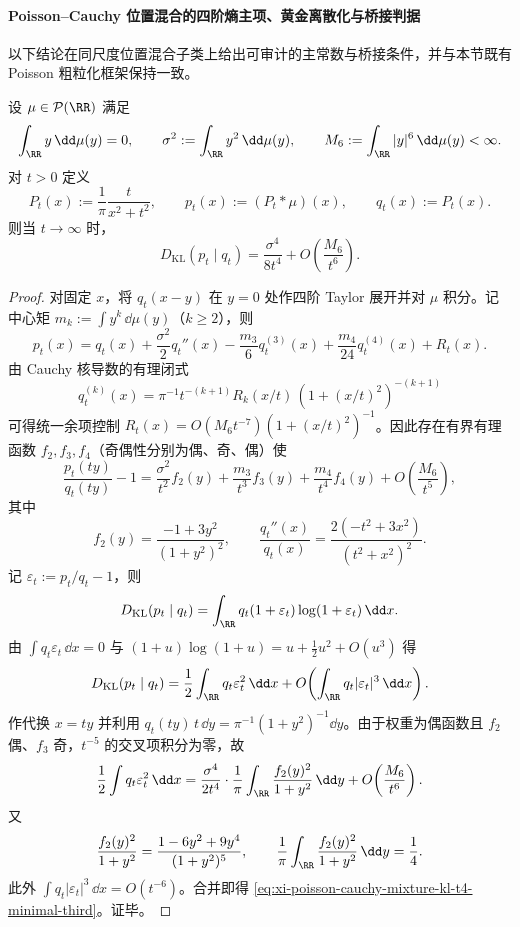 \paragraph{Poisson--Cauchy 位置混合的四阶熵主项、黄金离散化与桥接判据}
以下结论在同尺度位置混合子类上给出可审计的主常数与桥接条件，并与本节既有 Poisson 粗粒化框架保持一致。

\begin{theorem}\label{thm:xi-poisson-cauchy-mixture-kl-t4-minimal-third}
设 \(\mu\in\mathcal P(\RR)\) 满足
\[
\int_{\RR} y\,\dd\mu(y)=0,\qquad
\sigma^2:=\int_{\RR} y^2\,\dd\mu(y),\qquad
M_6:=\int_{\RR}|y|^6\,\dd\mu(y)<\infty.
\]
对 \(t>0\) 定义
\[
P_t(x):=\frac{1}{\pi}\frac{t}{x^2+t^2},\qquad
p_t(x):=(P_t*\mu)(x),\qquad
q_t(x):=P_t(x).
\]
则当 \(t\to\infty\) 时，
\begin{equation}\label{eq:xi-poisson-cauchy-mixture-kl-t4-minimal-third}
D_{\mathrm{KL}}(p_t\mid q_t)
=\frac{\sigma^4}{8t^4}
+O\!\left(\frac{M_6}{t^6}\right).
\end{equation}
\end{theorem}

\begin{proof}
对固定 \(x\)，将 \(q_t(x-y)\) 在 \(y=0\) 处作四阶 Taylor 展开并对 \(\mu\) 积分。记中心矩 \(m_k:=\int y^k\,\dd\mu(y)\)（\(k\ge 2\)），则
\[
p_t(x)
=q_t(x)
+\frac{\sigma^2}{2}q_t''(x)
-\frac{m_3}{6}q_t^{(3)}(x)
+\frac{m_4}{24}q_t^{(4)}(x)
+R_t(x).
\]
由 Cauchy 核导数的有理闭式
\[
q_t^{(k)}(x)=\pi^{-1}t^{-(k+1)}R_k(x/t)\,(1+(x/t)^2)^{-(k+1)}
\]
可得统一余项控制 \(R_t(x)=O(M_6t^{-7})(1+(x/t)^2)^{-1}\)。因此存在有界有理函数 \(f_2,f_3,f_4\)（奇偶性分别为偶、奇、偶）使
\[
\frac{p_t(ty)}{q_t(ty)}-1
=\frac{\sigma^2}{t^2}f_2(y)
+\frac{m_3}{t^3}f_3(y)
+\frac{m_4}{t^4}f_4(y)
+O\!\left(\frac{M_6}{t^5}\right),
\]
其中
\[
f_2(y)=\frac{-1+3y^2}{(1+y^2)^2},
\qquad
\frac{q_t''(x)}{q_t(x)}=\frac{2(-t^2+3x^2)}{(t^2+x^2)^2}.
\]
记 \(\varepsilon_t:=p_t/q_t-1\)，则
\[
D_{\mathrm{KL}}(p_t\mid q_t)
=\int_{\RR}q_t(1+\varepsilon_t)\log(1+\varepsilon_t)\,\dd x.
\]
由 \(\int q_t\varepsilon_t\,\dd x=0\) 与
\(
(1+u)\log(1+u)=u+\frac12u^2+O(u^3)
\)
得
\[
D_{\mathrm{KL}}(p_t\mid q_t)
=\frac12\int_{\RR}q_t\varepsilon_t^2\,\dd x
+O\!\left(\int_{\RR}q_t|\varepsilon_t|^3\,\dd x\right).
\]
作代换 \(x=ty\) 并利用 \(q_t(ty)\,t\,\dd y=\pi^{-1}(1+y^2)^{-1}\dd y\)。由于权重为偶函数且 \(f_2\) 偶、\(f_3\) 奇，\(t^{-5}\) 的交叉项积分为零，故
\[
\frac12\int q_t\varepsilon_t^2\,\dd x
=\frac{\sigma^4}{2t^4}\cdot
\frac{1}{\pi}\int_{\RR}\frac{f_2(y)^2}{1+y^2}\,\dd y
+O\!\left(\frac{M_6}{t^6}\right).
\]
又
\[
\frac{f_2(y)^2}{1+y^2}
=\frac{1-6y^2+9y^4}{(1+y^2)^5},
\qquad
\frac{1}{\pi}\int_{\RR}\frac{f_2(y)^2}{1+y^2}\,\dd y=\frac14.
\]
此外 \(\int q_t|\varepsilon_t|^3\,\dd x=O(t^{-6})\)。合并即得
\eqref{eq:xi-poisson-cauchy-mixture-kl-t4-minimal-third}。证毕。
\end{proof}

